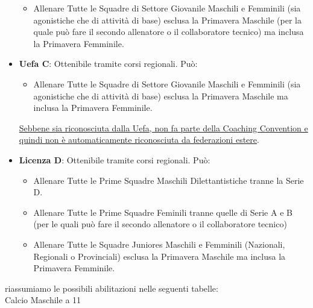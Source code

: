 \documentclass[../uefaC.tex]{subfiles}
\begin{document}
\begin{itemize}
\begin{itemize}
            \item Allenare Tutte le Squadre di Settore Giovanile Maschili e Femminili (sia agonistiche che di attività di base) esclusa la Primavera Maschile (per la quale può fare il secondo allenatore o il collaboratore tecnico) ma inclusa la Primavera Femminile.
        \end{itemize}
    \item\textbf{Uefa C}: Ottenibile tramite corsi regionali. Può:
        \begin{itemize}
            \item Allenare Tutte le Squadre di Settore Giovanile Maschili e Femminili (sia agonistiche che di attività di base) esclusa la Primavera Maschile ma inclusa la Primavera Femminile.
        \end{itemize}
        \underline{Sebbene sia riconosciuta dalla Uefa, non fa parte della Coaching Convention e quindi non è automaticamente riconosciuta da federazioni estere}.
    \item\textbf{Licenza D}:  Ottenibile tramite corsi regionali. Può:
        \begin{itemize}
            \item Allenare Tutte le Prime Squadre Maschili Dilettantistiche tranne la Serie D.
            \item Allenare Tutte le Prime Squadre Feminili tranne quelle di Serie A e B (per le quali può fare il secondo allenatore o il collaboratore tecnico)
            \item Allenare Tutte le Squadre Juniores Maschili e Femminili (Nazionali, Regionali o Provinciali) esclusa la Primavera Maschile ma inclusa la Primavera Femminile.
        \end{itemize}
\end{itemize}
riassumiamo le possibili abilitazioni nelle seguenti tabelle: \hfill \\

Calcio Maschile a 11  \hfill \\
\end{document}
